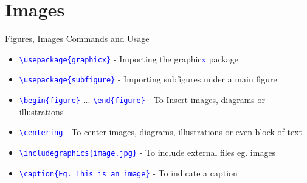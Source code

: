 \documentclass{beamer}
\begin{document}
	\section{Images}
	\begin{frame}{Figures, Images Commands and Usage}
		\begin{itemize}
			\item \texttt{\textcolor{blue}{\textbackslash usepackage\{graphicx\}}} - Importing the graphic\textcolor{blue}{x} package
			\item \texttt{\textcolor{blue}{\textbackslash usepackage\{subfigure\}}} - Importing subfigures under a main figure
			
			\item \texttt{\textcolor{blue}{\textbackslash begin\{figure\}}} ... \texttt{\textcolor{blue}{\textbackslash end\{figure\}}} - To Insert images, diagrams or illustrations
			\item \texttt{\textcolor{blue}{\textbackslash centering}} - To center images, diagrams, illustrations or even block of text
			
			\item \texttt{\textcolor{blue}{\textbackslash includegraphics\{image.jpg\}}} - To include external files eg. images
			\item \texttt{\textcolor{blue}{\textbackslash caption\{Eg. This is an image\}}} - To indicate a caption
			
			
		\end{itemize}
	\end{frame}
\end{document}
